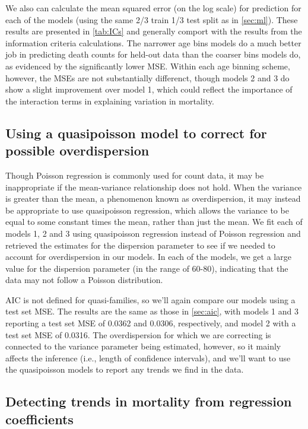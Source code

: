 \documentclass[11pt]{article}
\begin{document}
We also can calculate the mean squared error (on the log scale) for prediction for each of the models (using the same 2/3 train 1/3 test split as in \cref{sec:ml}). 
These results are presented in \cref{tab:ICs} and generally comport with the results from the information criteria calculations.
The narrower age bins models do a much better job in predicting death counts for held-out data than the coarser bins models do, as evidenced by the significantly lower MSE.
Within each age binning scheme, however, the MSEs are not substantially differenct, though models 2 and 3 do show a slight improvement over model 1, which could reflect the importance of the interaction terms in explaining variation in mortality. 

\subsection{Using a quasipoisson model to correct for possible overdispersion}\label{sec:qp}

Though Poisson regression is commonly used for count data, it may be inappropriate if the mean-variance relationship does not hold.
When the variance is greater than the mean, a phenomenon known as overdispersion, it may instead be appropriate to use quasipoisson regression, which allows the variance to be equal to some constant times the mean, rather than just the mean\cite{agresti_2019}. 
We fit each of models 1, 2 and 3 using quasipoisson regression instead of Poisson regression and retrieved the estimates for the dispersion parameter to see if we needed to account for overdispersion in our models. 
In each of the models, we get a large value for the dispersion parameter (in the range of 60-80), indicating that the data may not follow a Poisson distribution. 

AIC is not defined for quasi-families, so we'll again compare our models using a test set MSE.
The results are the same as those in \cref{sec:aic}, with models 1 and 3 reporting a test set MSE of 0.0362 and 0.0306, respectively, and model 2 with a test set MSE of 0.0316. 
The overdispersion for which we are correcting is connected to the variance parameter being estimated, however, so it mainly affects the inference (i.e., length of confidence intervals), and we'll want to use the quasipoisson models to report any trends we find in the data.

\subsection{Detecting trends in mortality from regression coefficients}\label{sec:inference}
\end{document}
